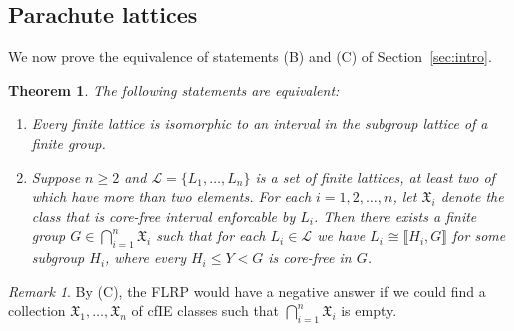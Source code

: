 \documentclass{gen-j-l}
\newcommand{\lb}{\ensuremath{\llbracket}}
\newcommand{\rb}{\ensuremath{\rrbracket}}
\newcommand{\<}{\ensuremath{\langle}}
\renewcommand{\>}{\ensuremath{\rangle}}
\theoremstyle{plain}
\newtheorem{theorem}{Theorem}[section]
\theoremstyle{definition}
\theoremstyle{remark}
\newtheorem*{remark}{Remark}
\numberwithin{theorem}{section}
\numberwithin{claim}{section}
\numberwithin{equation}{section}
\numberwithin{conjecture}{section}
\renewcommand{\leq}{\ensuremath{\leqslant}}
\renewcommand{\geq}{\ensuremath{\geqslant}}
\newcommand{\2}{\ensuremath{\mathbf{2}}}
\newcommand{\3}{\ensuremath{\mathbf{3}}}
\newcommand{\sG}{\ensuremath{\mathfrak{X}}}
\newcommand{\sL}{\ensuremath{\mathscr{L}}}
\begin{document}
\subsection{Parachute lattices}
\label{sec:parachute-lattices}
We now prove the equivalence of statements (B) and (C) 
of Section~\ref{sec:intro}.

\begin{theorem}
\label{thm-wjd-1}
The following statements are equivalent:
\begin{enumerate}
\item[(B)] Every finite lattice is isomorphic to
  an interval in the subgroup lattice of a finite group.

\item[(C)]
Suppose $n\geq 2$ and $\sL = \{L_1, \dots, L_n\}$ is a set of
finite lattices, at least two of which have more than two elements.
For each $i = 1, 2, \dots, n$, let $\sG_i$ denote the class that is
core-free interval enforcable by $L_i$. Then there exists a finite group $G \in
\bigcap\limits_{i=1}^n \sG_i$ such that for 
each $L_i \in \sL$ we have $L_i\cong \lb H_i, G \rb$ for some subgroup
$H_i$, where every $H_i \leq Y <G$ is core-free in $G$.
\end{enumerate}
\end{theorem}
\begin{remark}
By (C), the \acs{FLRP} would have a negative answer if we
could find a collection $\sG_1, \dots, \sG_n$ of \acs{cfIE} classes
such that $\bigcap\limits_{i=1}^n \sG_i$ is empty.
\end{remark}
\end{document}
